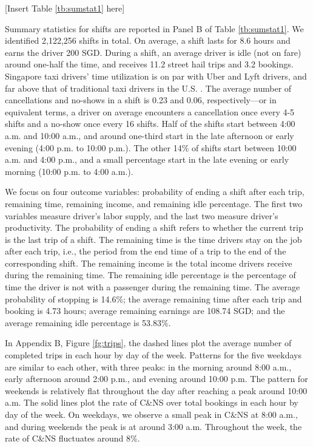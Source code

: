 \documentclass[reviewmode]{restat}
\begin{document}
\begin{center}
	[Insert Table \ref{tb:sumstat1} here]
\end{center}


Summary statistics for shifts are reported in Panel B of Table \ref{tb:sumstat1}. 
We identified 2,122,256 shifts in total. On average, a shift lasts for 8.6 hours and earns the driver 200 SGD. 
During a shift, an average driver is idle (not on fare) around one-half the time, and receives 11.2 street
hail trips and 3.2 bookings.  Singapore taxi drivers' time utilization is on par with Uber and Lyft drivers,
and far above that of traditional taxi drivers in the U.S. \citep{cramer2016disruptive}.
The average number of cancellations and no-shows in a shift is 0.23 and 0.06, respectively---or in equivalent terms,
a driver on average encounters a cancellation once every 4-5 shifts and a no-show once every 16 shifts.
Half of the shifts start between 4:00 a.m. and 10:00 a.m., and around one-third start in the late afternoon 
or early evening (4:00 p.m. to 10:00 p.m.). The other 14\% of shifts start between 10:00 a.m. and 4:00 p.m.,
and a small percentage start in the late evening or early morning (10:00 p.m. to 4:00 a.m.).


We focus on four outcome variables: probability of ending a shift after each trip, remaining time, 
remaining income, and remaining idle percentage. The first two variables measure driver's labor supply, 
and the last two measure driver's productivity. The probability of ending a shift refers to whether the 
current trip is the last trip of a shift. The remaining time is the time drivers stay on the job after
each trip, i.e., the period from the end time of a trip to the end of the corresponding shift. 
The remaining income is the total income drivers receive during the remaining time. 
The remaining idle percentage is the percentage of time the driver is not with a passenger during the remaining time.
The average probability of stopping is 14.6\%; the average remaining time after each trip and booking is 4.73 hours; 
average remaining earnings are 108.74 SGD; 
and the average remaining idle percentage is 53.83\%. 


In Appendix B, Figure \ref{fg:trips}, the dashed lines plot the average number of completed trips in each hour by day
of the week. Patterns for the five weekdays are similar to each other, with three peaks: in the morning 
around 8:00 a.m., early afternoon around 2:00 p.m., and evening around 10:00 p.m. The pattern for weekends 
is relatively flat throughout the day after reaching a peak around 10:00 a.m. The solid lines plot the rate 
of C\&NS over total bookings in each hour by day of the week. On weekdays, we observe a small peak in C\&NS 
at 8:00 a.m., and during weekends the peak is at around 3:00 a.m. Throughout the week, the rate of C\&NS 
fluctuates around 8\%.
\end{document}
